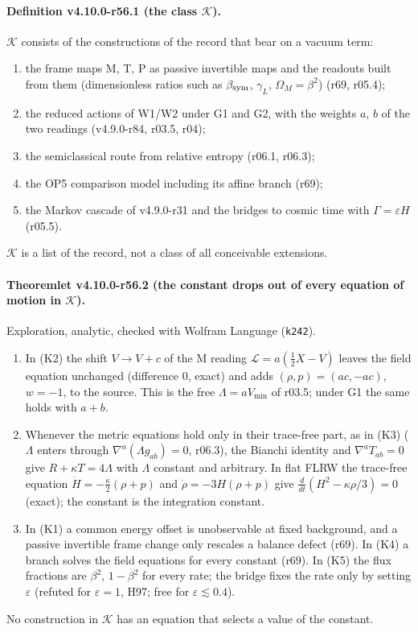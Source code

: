 \paragraph{Definition v4.10.0-r56.1 (the class \(\mathcal K\)).}
\(\mathcal K\) consists of the constructions of the record that bear on a vacuum term:
\begin{enumerate}[leftmargin=2em]
\item[(K1)] the frame maps M, T, P as passive invertible maps and the readouts built from them (dimensionless ratios such as \(\beta_{\rm sym}\), \(\gamma_L\),
\(\Omega_M=\beta^2\)) (r69, r05.4);
\item[(K2)] the reduced actions of W1/W2 under G1 and G2, with the weights \(a\), \(b\) of the two readings (v4.9.0-r84, r03.5, r04);
\item[(K3)] the semiclassical route from relative entropy (r06.1, r06.3);
\item[(K4)] the OP5 comparison model including its affine branch (r69);
\item[(K5)] the Markov cascade of v4.9.0-r31 and the bridges to cosmic time with \(\Gamma=\varepsilon H\) (r05.5).
\end{enumerate}
\(\mathcal K\) is a list of the record, not a class of all conceivable extensions.

\paragraph{Theoremlet v4.10.0-r56.2 (the constant drops out of every equation of motion in \(\mathcal K\)).}
Exploration, analytic, checked with Wolfram Language (\texttt{k242}).
\begin{enumerate}[leftmargin=2em]
\item[(a)] In (K2) the shift \(V\to V+c\) of the M reading \(\mathcal L=a(\tfrac12X-V)\) leaves the field equation unchanged (difference \(0\), exact) and adds
\((\rho,p)=(ac,-ac)\), \(w=-1\), to the source.  This is the free \(\Lambda=aV_{\min}\) of r03.5; under G1 the same holds with \(a+b\).
\item[(b)] Whenever the metric equations hold only in their trace-free part, as in (K3) (\(\Lambda\) enters through \(\nabla^a(\Lambda g_{ab})=0\), r06.3), the
Bianchi identity and \(\nabla^aT_{ab}=0\) give \(R+\kappa T=4\Lambda\) with \(\Lambda\) constant and arbitrary.  In flat FLRW the trace-free equation
\(\dot H=-\tfrac\kappa2(\rho+p)\) and \(\dot\rho=-3H(\rho+p)\) give \(\tfrac{d}{dt}(H^2-\kappa\rho/3)=0\) (exact); the constant is the integration constant.
\item[(c)] In (K1) a common energy offset is unobservable at fixed background, and a passive invertible frame change only rescales a balance defect
(r69).  In (K4) a branch solves the field equations for every constant (r69).  In (K5) the flux fractions are \(\beta^2\), \(1-\beta^2\) for every rate;
the bridge fixes the rate only by setting \(\varepsilon\) (refuted for \(\varepsilon=1\), H97; free for \(\varepsilon\lesssim0.4\)).
\end{enumerate}
No construction in \(\mathcal K\) has an equation that selects a value of the constant.


